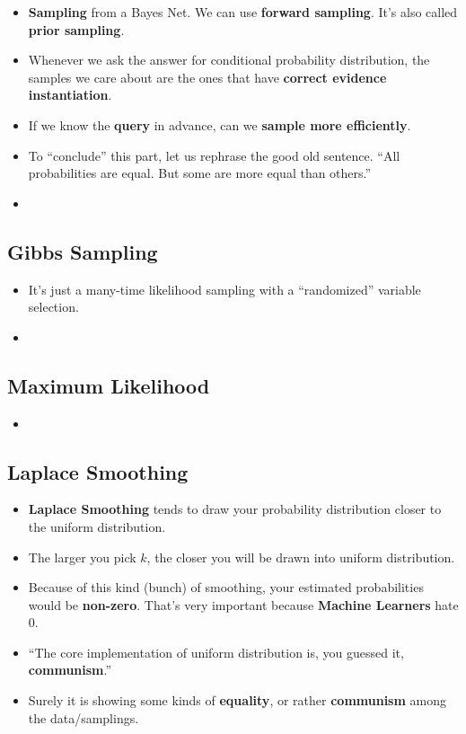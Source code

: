 \documentclass[twocolumn]{article}
\begin{document}
\begin{itemize}
\item \textbf{Sampling} from a Bayes Net. We can use \textbf{forward
    sampling}. It's also called \textbf{prior sampling}.
\item Whenever we ask the answer for conditional probability
  distribution, the samples we care about are the ones that have
  \textbf{correct evidence instantiation}. 
\item If we know the \textbf{query} in advance, can we \textbf{sample
    more efficiently}.
\item To ``conclude'' this part, let us rephrase the good old
  sentence. ``All probabilities are equal. But some are more equal
  than others.''
\item 
\end{itemize}

\subsection{Gibbs Sampling}
\label{sec:gibbs-sampling}

\begin{itemize}
\item It's just a many-time likelihood sampling with a ``randomized''
  variable selection.
\item 
\end{itemize}

\subsection{Maximum Likelihood}
\label{sec:maximum-likelihood}

\begin{itemize}
\item 
\end{itemize}


\subsection{Laplace Smoothing}
\label{sec:laplace-smoothing}

\begin{itemize}
\item \textbf{Laplace Smoothing} tends to draw your probability
  distribution closer to the uniform distribution.
\item The larger you pick $k$, the closer you will be drawn into
  uniform distribution.
\item Because of this kind (bunch) of smoothing, your estimated
  probabilities would be \textbf{non-zero}. That's very important
  because \textbf{Machine Learners} hate 0.
\item ``The core implementation of uniform distribution is, you
  guessed it, \textbf{communism}.''
\item Surely it is showing some kinds of \textbf{equality}, or rather
  \textbf{communism} among the data/samplings.
\end{itemize}
\end{document}
